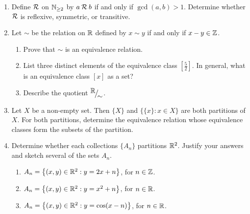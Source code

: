 \begin{enumerate}
	\item Define $\mathcal{R}$ on $\mathbb{N}_{\ge 2}$ by $a\mathbin{\mathcal{R}} b$ if and only if $\gcd(a,b) > 1$. Determine whether $\mathcal{R}$ is reflexive, symmetric, or transitive. 

	\item Let $\sim$ be the relation on $\mathbb{R}$ defined by $x \sim y$ if and only if $x - y \in \mathbb{Z}$.
	\begin{enumerate}
    \item Prove that $\sim$ is an equivalence relation.
    \item List three distinct elements of the equivalence class $[\frac 52]$. In general, what is an equivalence class $[x]$ as a set?
    \item Describe the quotient ${}^{\textstyle {\mathbb{R}}}\!\big/_{\textstyle \!{\sim}}$.
	\end{enumerate}

	\item Let $X$ be a non-empty set. Then $\{X\}$ and $\bigl\{\{x\} : x \in X\bigr\}$ are both partitions of $X$. For both partitions, determine the equivalence relation whose equivalence classes form the subsets of the partition.

	\item Determine whether each collections $\{A_n\}$ partitions $\mathbb{R}^2$. Justify your answers and sketch several of the sets $A_n$.
	\begin{enumerate}
		\item $A_n=\bigl\{(x,y)\in\mathbb{R}^2:y=2x+n\bigr\}$, for $n\in\mathbb{Z}$.
	  \item $A_n=\bigl\{(x,y)\in\mathbb{R}^2:y=x^2+n\bigr\}$, for $n\in\mathbb{R}$.
	  \item $A_n=\bigl\{(x,y)\in\mathbb{R}^2:y=\cos(x-n)\bigr\}$, for $n\in\mathbb{R}$.
	\end{enumerate}
\end{enumerate}

